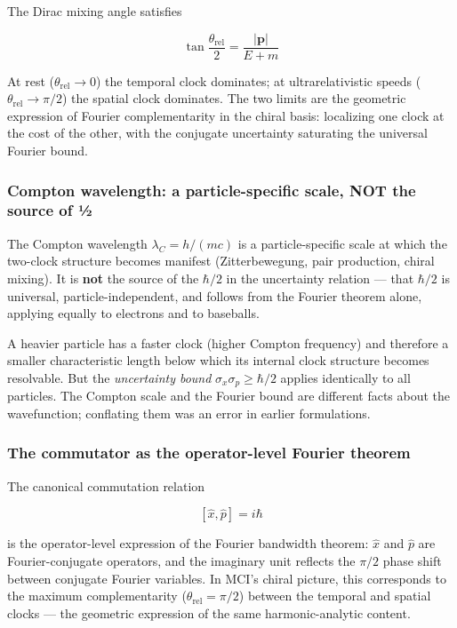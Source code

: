 \documentclass[
]{article}
\begin{document}
The Dirac mixing angle satisfies

\[\tan\frac{\theta_{\text{rel}}}{2} = \frac{|\mathbf{p}|}{E + m}\]

At rest (\(\theta_{\text{rel}} \to 0\)) the temporal clock dominates; at
ultrarelativistic speeds (\(\theta_{\text{rel}} \to \pi/2\)) the spatial
clock dominates. The two limits are the geometric expression of Fourier
complementarity in the chiral basis: localizing one clock at the cost of
the other, with the conjugate uncertainty saturating the universal
Fourier bound.

\subsubsection{Compton wavelength: a particle-specific scale, NOT the
source of
½}\label{compton-wavelength-a-particle-specific-scale-not-the-source-of-uxbd}

The Compton wavelength \(\lambda_C = h/(mc)\) is a particle-specific
scale at which the two-clock structure becomes manifest (Zitterbewegung,
pair production, chiral mixing). It is \textbf{not} the source of the
\(\hbar/2\) in the uncertainty relation --- that \(\hbar/2\) is
universal, particle-independent, and follows from the Fourier theorem
alone, applying equally to electrons and to baseballs.

A heavier particle has a faster clock (higher Compton frequency) and
therefore a smaller characteristic length below which its internal clock
structure becomes resolvable. But the \emph{uncertainty bound}
\(\sigma_x \sigma_p \geq \hbar/2\) applies identically to all particles.
The Compton scale and the Fourier bound are different facts about the
wavefunction; conflating them was an error in earlier formulations.

\subsubsection{The commutator as the operator-level Fourier
theorem}\label{the-commutator-as-the-operator-level-fourier-theorem}

The canonical commutation relation

\[[\hat{x}, \hat{p}] = i\hbar\]

is the operator-level expression of the Fourier bandwidth theorem:
\(\hat{x}\) and \(\hat{p}\) are Fourier-conjugate operators, and the
imaginary unit reflects the \(\pi/2\) phase shift between conjugate
Fourier variables. In MCI's chiral picture, this corresponds to the
maximum complementarity (\(\theta_{\text{rel}} = \pi/2\)) between the
temporal and spatial clocks --- the geometric expression of the same
harmonic-analytic content.
\end{document}
